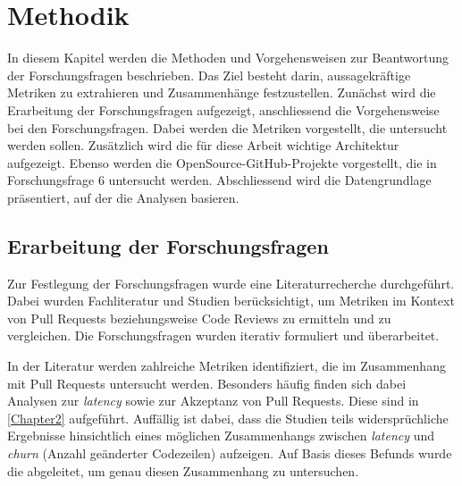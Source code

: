 


\chapter{Methodik} %

\label{Chapter3} %

In diesem Kapitel werden die Methoden und Vorgehensweisen zur Beantwortung der Forschungsfragen beschrieben. Das Ziel besteht darin, aussagekräftige Metriken zu extrahieren und Zusammenhänge festzustellen.
Zunächst wird die Erarbeitung der Forschungsfragen aufgezeigt, anschliessend die Vorgehensweise bei den Forschungsfragen. Dabei werden die Metriken vorgestellt, die untersucht werden sollen. Zusätzlich wird die für diese Arbeit wichtige Architektur aufgezeigt. Ebenso werden die OpenSource-GitHub-Projekte vorgestellt, die in Forschungsfrage 6 untersucht werden. Abschliessend wird die Datengrundlage präsentiert, auf der die Analysen basieren.

\section{Erarbeitung der Forschungsfragen}
\label{sec:ErarbeitungFF}
Zur Festlegung der Forschungsfragen wurde eine Literaturrecherche durchgeführt. Dabei wurden Fachliteratur und Studien berücksichtigt, um Metriken im Kontext von Pull Requests beziehungsweise Code Reviews zu ermitteln und zu vergleichen. Die Forschungsfragen wurden iterativ formuliert und überarbeitet.

In der Literatur werden zahlreiche Metriken identifiziert, die im Zusammenhang mit Pull Requests untersucht werden. Besonders häufig finden sich dabei Analysen zur \textit{latency} sowie zur Akzeptanz von Pull Requests. Diese sind in \autoref{Chapter2} aufgeführt. Auffällig ist dabei, dass die Studien teils widersprüchliche Ergebnisse hinsichtlich eines möglichen Zusammenhangs zwischen \textit{latency} und \textit{churn} (Anzahl geänderter Codezeilen) aufzeigen. Auf Basis dieses Befunds wurde die  abgeleitet, um genau diesen Zusammenhang zu untersuchen.


